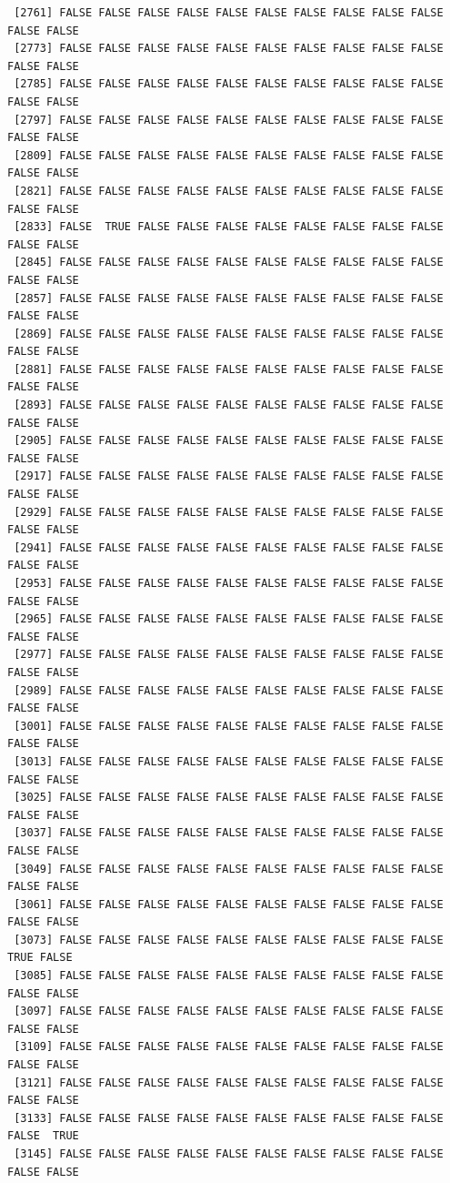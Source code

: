 \documentclass[
  a4paper,
  DIV=11,
  numbers=noendperiod]{scrartcl}
\begin{document}
\begin{verbatim}
 [2761] FALSE FALSE FALSE FALSE FALSE FALSE FALSE FALSE FALSE FALSE FALSE FALSE
 [2773] FALSE FALSE FALSE FALSE FALSE FALSE FALSE FALSE FALSE FALSE FALSE FALSE
 [2785] FALSE FALSE FALSE FALSE FALSE FALSE FALSE FALSE FALSE FALSE FALSE FALSE
 [2797] FALSE FALSE FALSE FALSE FALSE FALSE FALSE FALSE FALSE FALSE FALSE FALSE
 [2809] FALSE FALSE FALSE FALSE FALSE FALSE FALSE FALSE FALSE FALSE FALSE FALSE
 [2821] FALSE FALSE FALSE FALSE FALSE FALSE FALSE FALSE FALSE FALSE FALSE FALSE
 [2833] FALSE  TRUE FALSE FALSE FALSE FALSE FALSE FALSE FALSE FALSE FALSE FALSE
 [2845] FALSE FALSE FALSE FALSE FALSE FALSE FALSE FALSE FALSE FALSE FALSE FALSE
 [2857] FALSE FALSE FALSE FALSE FALSE FALSE FALSE FALSE FALSE FALSE FALSE FALSE
 [2869] FALSE FALSE FALSE FALSE FALSE FALSE FALSE FALSE FALSE FALSE FALSE FALSE
 [2881] FALSE FALSE FALSE FALSE FALSE FALSE FALSE FALSE FALSE FALSE FALSE FALSE
 [2893] FALSE FALSE FALSE FALSE FALSE FALSE FALSE FALSE FALSE FALSE FALSE FALSE
 [2905] FALSE FALSE FALSE FALSE FALSE FALSE FALSE FALSE FALSE FALSE FALSE FALSE
 [2917] FALSE FALSE FALSE FALSE FALSE FALSE FALSE FALSE FALSE FALSE FALSE FALSE
 [2929] FALSE FALSE FALSE FALSE FALSE FALSE FALSE FALSE FALSE FALSE FALSE FALSE
 [2941] FALSE FALSE FALSE FALSE FALSE FALSE FALSE FALSE FALSE FALSE FALSE FALSE
 [2953] FALSE FALSE FALSE FALSE FALSE FALSE FALSE FALSE FALSE FALSE FALSE FALSE
 [2965] FALSE FALSE FALSE FALSE FALSE FALSE FALSE FALSE FALSE FALSE FALSE FALSE
 [2977] FALSE FALSE FALSE FALSE FALSE FALSE FALSE FALSE FALSE FALSE FALSE FALSE
 [2989] FALSE FALSE FALSE FALSE FALSE FALSE FALSE FALSE FALSE FALSE FALSE FALSE
 [3001] FALSE FALSE FALSE FALSE FALSE FALSE FALSE FALSE FALSE FALSE FALSE FALSE
 [3013] FALSE FALSE FALSE FALSE FALSE FALSE FALSE FALSE FALSE FALSE FALSE FALSE
 [3025] FALSE FALSE FALSE FALSE FALSE FALSE FALSE FALSE FALSE FALSE FALSE FALSE
 [3037] FALSE FALSE FALSE FALSE FALSE FALSE FALSE FALSE FALSE FALSE FALSE FALSE
 [3049] FALSE FALSE FALSE FALSE FALSE FALSE FALSE FALSE FALSE FALSE FALSE FALSE
 [3061] FALSE FALSE FALSE FALSE FALSE FALSE FALSE FALSE FALSE FALSE FALSE FALSE
 [3073] FALSE FALSE FALSE FALSE FALSE FALSE FALSE FALSE FALSE FALSE  TRUE FALSE
 [3085] FALSE FALSE FALSE FALSE FALSE FALSE FALSE FALSE FALSE FALSE FALSE FALSE
 [3097] FALSE FALSE FALSE FALSE FALSE FALSE FALSE FALSE FALSE FALSE FALSE FALSE
 [3109] FALSE FALSE FALSE FALSE FALSE FALSE FALSE FALSE FALSE FALSE FALSE FALSE
 [3121] FALSE FALSE FALSE FALSE FALSE FALSE FALSE FALSE FALSE FALSE FALSE FALSE
 [3133] FALSE FALSE FALSE FALSE FALSE FALSE FALSE FALSE FALSE FALSE FALSE  TRUE
 [3145] FALSE FALSE FALSE FALSE FALSE FALSE FALSE FALSE FALSE FALSE FALSE FALSE

\end{verbatim}
\end{document}
